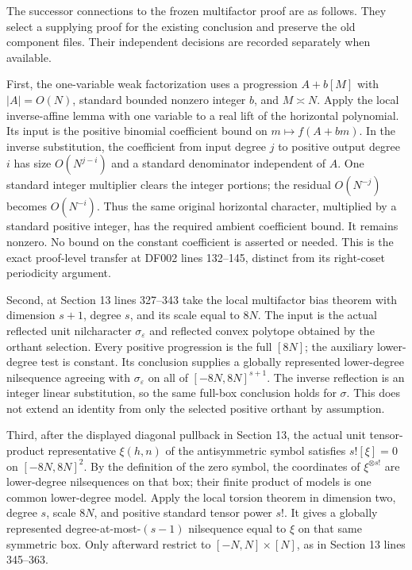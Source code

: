 \documentclass[11pt]{article}
\begin{document}
The successor connections to the frozen multifactor proof are as follows.
They select a supplying proof for the existing conclusion and preserve
the old component files. Their independent decisions are recorded
separately when available.

First, the one-variable weak factorization uses a progression
$A+b[M]$ with $|A|=O(N)$, standard bounded nonzero integer $b$, and
$M\asymp N$. Apply the local inverse-affine lemma with one variable
to a real lift of the horizontal polynomial. Its input is the positive
binomial coefficient bound on $m\mapsto f(A+bm)$. In the inverse
substitution, the coefficient from input degree $j$ to positive output
degree $i$ has size $O(N^{j-i})$ and a standard denominator independent
of $A$. One standard integer multiplier clears the integer portions;
the residual $O(N^{-j})$ becomes $O(N^{-i})$. Thus the same original
horizontal character, multiplied by a standard positive integer,
has the required ambient coefficient bound. It remains nonzero.
No bound on the constant coefficient is asserted or needed. This is
the exact proof-level transfer at DF002 lines 132--145, distinct from
its right-coset periodicity argument.

Second, at Section 13 lines 327--343 take the local multifactor bias
theorem with dimension $s+1$, degree $s$, and its scale equal to $8N$.
The input is the actual reflected unit nilcharacter
$\sigma_\varepsilon$ and reflected convex polytope obtained by the
orthant selection. Every positive progression is the full $[8N]$;
the auxiliary lower-degree test is constant. Its conclusion supplies
a globally represented lower-degree nilsequence agreeing with
$\sigma_\varepsilon$ on all of $[-8N,8N]^{s+1}$.
The inverse reflection is an integer linear substitution, so the
same full-box conclusion holds for $\sigma$. This does not extend
an identity from only the selected positive orthant by assumption.

Third, after the displayed diagonal pullback in Section 13, the
actual unit tensor-product representative $\xi(h,n)$ of the
antisymmetric symbol satisfies $s![\xi]=0$ on $[-8N,8N]^2$.
By the definition of the zero symbol, the coordinates of
$\xi^{\otimes s!}$ are lower-degree nilsequences on that box;
their finite product of models is one common lower-degree model.
Apply the local torsion theorem in dimension two, degree $s$, scale
$8N$, and positive standard tensor power $s!$. It gives a globally
represented degree-at-most-$(s-1)$ nilsequence equal to $\xi$ on
that same symmetric box. Only afterward restrict to
$[-N,N]\times[N]$, as in Section 13 lines 345--363.
\end{document}
